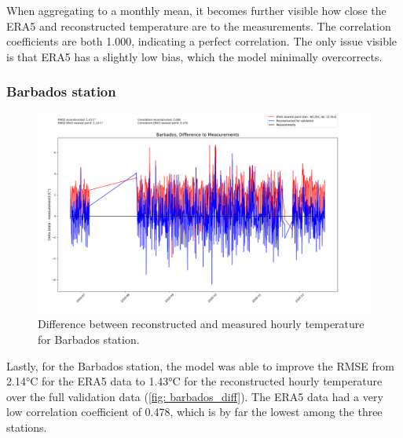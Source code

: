 When aggregating to a monthly mean, it becomes further visible how close the ERA5 and reconstructed temperature are to the measurements. The correlation coefficients are both 1.000, indicating a perfect correlation.
The only issue visible is that ERA5 has a slightly low bias, which the model minimally overcorrects.

\subsubsection*{Barbados station}

\begin{figure}
    \centering
    \includegraphics[width=1.00\textwidth]{resources/images/charts/barbados_eval_grib_final/Barbados, Difference to Measurements.png}
    \caption{Difference between reconstructed and measured hourly temperature for Barbados station.}
    \label{fig: barbados_diff}
\end{figure}

Lastly, for the Barbados station, the model was able to improve the RMSE from 2.14°C for the ERA5 data to 1.43°C for the reconstructed hourly temperature over the full validation data (\autoref{fig: barbados_diff}).
The ERA5 data had a very low correlation coefficient of 0.478, which is by far the lowest among the three stations.

